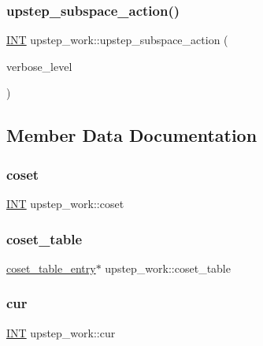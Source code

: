 \subsubsection{\texorpdfstring{upstep\+\_\+subspace\+\_\+action()}{upstep\_subspace\_action()}}
{\footnotesize\ttfamily \mbox{\hyperlink{galois_8h_a09fddde158a3a20bd2dcadb609de11dc}{I\+NT}} upstep\+\_\+work\+::upstep\+\_\+subspace\+\_\+action (\begin{DoxyParamCaption}\item[{\mbox{\hyperlink{galois_8h_a09fddde158a3a20bd2dcadb609de11dc}{I\+NT}}}]{verbose\+\_\+level }\end{DoxyParamCaption})}



\subsection{Member Data Documentation}
\mbox{\label{classupstep__work_ac4031be49b9093dc7231142dc66073fe}} 
\subsubsection{\texorpdfstring{coset}{coset}}
{\footnotesize\ttfamily \mbox{\hyperlink{galois_8h_a09fddde158a3a20bd2dcadb609de11dc}{I\+NT}} upstep\+\_\+work\+::coset}

\mbox{\label{classupstep__work_a7dd68a0b9009863c731d470bf57c2b6b}} 
\subsubsection{\texorpdfstring{coset\+\_\+table}{coset\_table}}
{\footnotesize\ttfamily \mbox{\hyperlink{structcoset__table__entry}{coset\+\_\+table\+\_\+entry}}$\ast$ upstep\+\_\+work\+::coset\+\_\+table}

\mbox{\label{classupstep__work_a0694546995210ad7623f9489c968ec29}} 
\subsubsection{\texorpdfstring{cur}{cur}}
{\footnotesize\ttfamily \mbox{\hyperlink{galois_8h_a09fddde158a3a20bd2dcadb609de11dc}{I\+NT}} upstep\+\_\+work\+::cur}


